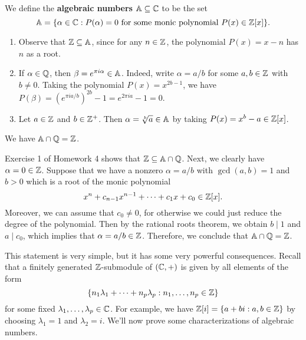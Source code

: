 \begin{defn}{}
    We define the {\bf algebraic numbers} $\mathbb{A} \subseteq \mathbb{C}$ to be the set 
    \[ \mathbb{A} = \{\alpha \in \mathbb{C} : P(\alpha) = 0 \text{ for some monic polynomial }
    P(x) \in \mathbb{Z}[x]\}. \] 
\end{defn}

\begin{exmp}{}
    \begin{enumerate}[(1)]
        \item Observe that $\mathbb{Z} \subseteq \mathbb{A}$, since for any $n \in \mathbb{Z}$, the 
              polynomial $P(x) = x - n$ has $n$ as a root. 
        \item If $\alpha \in \mathbb{Q}$, then $\beta = e^{\pi i\alpha} \in \mathbb{A}$. Indeed, 
              write $\alpha = a/b$ for some $a, b \in \mathbb{Z}$ with $b \neq 0$. 
              Taking the polynomial $P(x) = x^{2b-1}$, we have $P(\beta) = 
              (e^{\pi ia/b})^{2b} - 1 = e^{2\pi ia} - 1 = 0$. 
        \item Let $a \in \mathbb{Z}$ and $b \in \mathbb{Z}^+$. Then $\alpha = \sqrt[b]{a} \in 
              \mathbb{A}$ by taking $P(x) = x^b - a \in \mathbb{Z}[x]$. 
    \end{enumerate}
\end{exmp}

\begin{lemma}{}
    We have $\mathbb{A} \cap \mathbb{Q} = \mathbb{Z}$. 
\end{lemma}
\begin{pf}
    Exercise 1 of Homework 4 shows that $\mathbb{Z} \subseteq \mathbb{A} \cap \mathbb{Q}$. Next, 
    we clearly have $\alpha = 0 \in \mathbb{Z}$. Suppose that we have a 
    nonzero $\alpha = a/b$ with $\gcd(a, b) = 1$ and $b > 0$ which is a root 
    of the monic polynomial 
    \[ x^n + c_{n-1} x^{n-1} + \cdots + c_1 x + c_0 \in \mathbb{Z}[x]. \] 
    Moreover, we can assume that $c_0 \neq 0$, for otherwise we could just 
    reduce the degree of the polynomial. Then by the rational roots theorem, 
    we obtain $b \mid 1$ and $a \mid c_0$, which implies that $\alpha = 
    a/b \in \mathbb{Z}$. Therefore, we conclude that $\mathbb{A} \cap \mathbb{Q} = \mathbb{Z}$. 
\end{pf}

This statement is very simple, but it has some very powerful consequences. 
Recall that a finitely generated $\mathbb{Z}$-submodule of $(\mathbb{C}, +)$ is given by 
all elements of the form 
\[ \{n_1 \lambda_1 + \cdots + n_p \lambda_p : n_1, \dots, n_p \in \mathbb{Z}\} \] 
for some fixed $\lambda_1, \dots, \lambda_p \in \mathbb{C}$. For example, we have 
$\mathbb{Z}[i] = \{a + bi : a, b \in \mathbb{Z}\}$ by choosing $\lambda_1 = 1$ and $\lambda_2 = i$.
We'll now prove some characterizations of algebraic numbers.  

